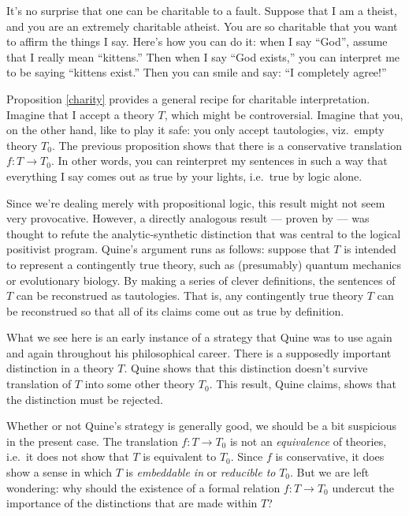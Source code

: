 \begin{disc} \label{qgood} It's no
  surprise that one can be charitable to a fault.  Suppose that I am a
  theist, and you are an extremely charitable atheist.  You are so
  charitable that you want to affirm the things I say.  Here's how you
  can do it: when I say ``God'', assume that I really mean
  ``kittens.''  Then when I say ``God exists,'' you can interpret me
  to be saying ``kittens exist.''  Then you can smile and say: ``I
  completely agree!''

  Proposition \ref{charity} provides a general recipe for charitable
  interpretation.  Imagine that I accept a theory $T$, which might be
  controversial.  Imagine that you, on the other hand, like to play it
  safe: you only accept tautologies, viz.\ empty theory $T_0$.  The
  previous proposition shows that there is a conservative translation
  $f:T\to T_0$.  In other words, you can reinterpret my sentences in
  such a way that everything I say comes out as true by your lights,
  i.e.\ true by logic alone.

  Since we're dealing merely with propositional logic, this result
  might not seem very provocative.  However, a directly analogous
  result --- proven by \cite{quine-goodman,quine-implicit} --- was
  thought to refute the analytic-synthetic distinction that was
  central to the logical positivist program.  Quine's argument runs as
  follows: suppose that $T$ is intended to represent a contingently
  true theory, such as (presumably) quantum mechanics or evolutionary
  biology.  By making a series of clever definitions, the sentences of
  $T$ can be reconstrued as tautologies.  That is, any contingently
  true theory $T$ can be reconstrued so that all of its claims come
  out as true by definition.

  What we see here is an early instance of a strategy that Quine was
  to use again and again throughout his philosophical career.  There
  is a supposedly important distinction in a theory $T$.  Quine shows
  that this distinction doesn't survive translation of $T$ into some
  other theory $T_0$.  This result, Quine claims, shows that the
  distinction must be rejected.

  Whether or not Quine's strategy is generally good, we should be a
  bit suspicious in the present case.  The translation $f:T\to T_0$ is
  not an {\it equivalence} of theories, i.e.\ it does not show that
  $T$ is equivalent to $T_0$.  Since $f$ is conservative, it does show
  a sense in which $T$ is {\it embeddable in} or {\it reducible to}
  $T_0$.  But we are left wondering: why should the existence of a
  formal relation $f:T\to T_0$ undercut the importance of the
  distinctions that are made within $T$?
\end{disc}

